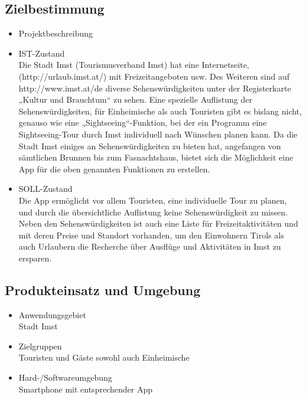 \subsection{Zielbestimmung}
\begin{itemize}
	\item Projektbeschreibung
	\item IST-Zustand\\
	Die Stadt Imst (Tourismusverband Imst) hat eine Internetseite, (http://urlaub.imst.at/) mit Freizeitangeboten usw. Des Weiteren sind auf http://www.imst.at/de diverse Sehenswürdigkeiten unter der Registerkarte „Kultur und Brauchtum“ zu sehen.
	Eine spezielle Auflistung der Sehenswürdigkeiten, für Einheimische als auch Touristen gibt es bislang nicht, genauso wie eine „Sightseeing“-Funktion, bei der ein Programm eine Sightseeing-Tour durch Imst individuell nach Wünschen planen kann.
	Da die Stadt Imst einiges an Sehenswürdigkeiten zu bieten hat, angefangen von sämtlichen Brunnen bis zum Fasnachtshaus, bietet sich die Möglichkeit eine App für die oben genannten Funktionen zu erstellen.\\
		
	\item SOLL-Zustand\\
	Die App ermöglicht vor allem Touristen, eine individuelle Tour zu planen, und durch die übersichtliche Auflistung keine Sehenswürdigkeit zu missen.
	Neben den Sehenswürdigkeiten ist auch eine Liste für Freizeitaktivitäten und mit deren Preise und Standort vorhanden, um den Einwohnern Tirols als auch Urlaubern die Recherche über Ausflüge und Aktivitäten in Imst zu ersparen.\\
	
\end{itemize}
\subsection{Produkteinsatz und Umgebung}
\begin{itemize}
	\item Anwendungsgebiet\\
	Stadt Imst
	\item Zielgruppen\\
	Touristen und Gäste sowohl auch Einheimische
	\item Hard-/Softwareumgebung\\
	Smartphone mit entsprechender App
	
\end{itemize}
